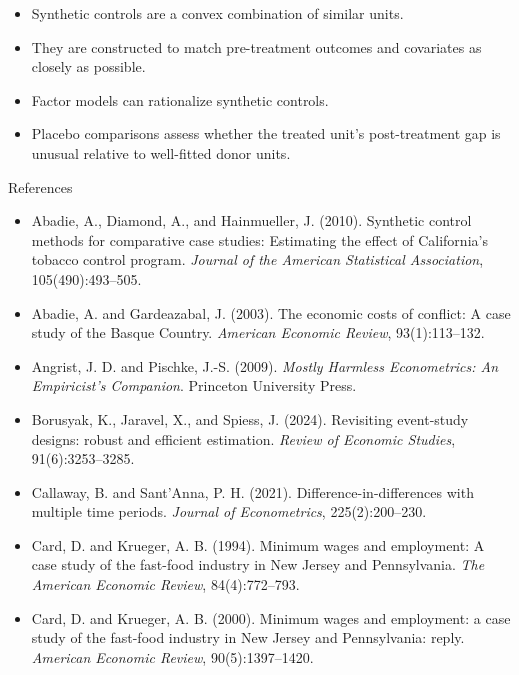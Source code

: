 \documentclass[11pt,aspectratio=169]{beamer}
\begin{document}
\begin{summaryframe}[Conclusion]
\begin{itemize}
  \item Synthetic controls are a convex combination of similar units.
  \item They are constructed to match pre-treatment outcomes and covariates as closely as possible.
  \item Factor models can rationalize synthetic controls.
  \item Placebo comparisons assess whether the treated unit's post-treatment gap is unusual relative to well-fitted donor units.
\end{itemize}
\end{summaryframe}


\begin{frame}{References}
\scriptsize
\begin{itemize}
  \item Abadie, A., Diamond, A., and Hainmueller, J. (2010). Synthetic control methods for comparative case studies: Estimating the effect of California's tobacco control program. \emph{Journal of the American Statistical Association}, 105(490):493--505.
  \item Abadie, A. and Gardeazabal, J. (2003). The economic costs of conflict: A case study of the Basque Country. \emph{American Economic Review}, 93(1):113--132.
  \item Angrist, J. D. and Pischke, J.-S. (2009). \emph{Mostly Harmless Econometrics: An Empiricist's Companion}. Princeton University Press.
  \item Borusyak, K., Jaravel, X., and Spiess, J. (2024). Revisiting event-study designs: robust and efficient estimation. \emph{Review of Economic Studies}, 91(6):3253--3285.
  \item Callaway, B. and Sant'Anna, P. H. (2021). Difference-in-differences with multiple time periods. \emph{Journal of Econometrics}, 225(2):200--230.
  \item Card, D. and Krueger, A. B. (1994). Minimum wages and employment: A case study of the fast-food industry in New Jersey and Pennsylvania. \emph{The American Economic Review}, 84(4):772--793.
  \item Card, D. and Krueger, A. B. (2000). Minimum wages and employment: a case study of the fast-food industry in New Jersey and Pennsylvania: reply. \emph{American Economic Review}, 90(5):1397--1420.
\end{itemize}
\end{frame}
\end{document}
